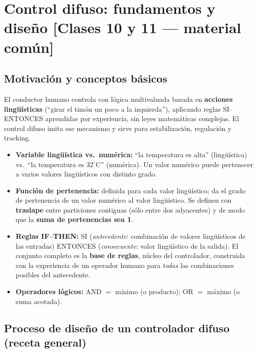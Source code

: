 \documentclass[11pt,a4paper]{article}
\newcommand{\grados}{^{\circ}}
\begin{document}
\section{Control difuso: fundamentos y diseño \hfill {\normalsize [Clases 10 y 11 — material común]}}

\subsection{Motivación y conceptos básicos}

El conductor humano controla con lógica multivaluada basada en \textbf{acciones lingüísticas} (``girar el timón un poco a la izquierda''), aplicando reglas SI--ENTONCES aprendidas por experiencia, sin leyes matemáticas complejas. El control difuso imita ese mecanismo y sirve para estabilización, regulación y tracking.

\begin{itemize}[itemsep=1pt]
\item \textbf{Variable lingüística vs.\ numérica:} ``la temperatura es alta'' (lingüística) vs.\ ``la temperatura es $32\grados$C'' (numérica). Un valor numérico puede pertenecer a varios valores lingüísticos con distinto grado.
\item \textbf{Función de pertenencia:} definida para cada valor lingüístico; da el grado de pertenencia de un valor numérico al valor lingüístico. Se definen con \textbf{traslape} entre particiones contiguas (sólo entre dos adyacentes) y de modo que la \textbf{suma de pertenencias sea 1}.
\item \textbf{Reglas IF--THEN:} SI (\emph{antecedente}: combinación de valores lingüísticos de las entradas) ENTONCES (\emph{consecuente}: valor lingüístico de la salida). El conjunto completo es la \textbf{base de reglas}, núcleo del controlador, construida con la experiencia de un operador humano para \emph{todas} las combinaciones posibles del antecedente.
\item \textbf{Operadores lógicos:} AND $=$ mínimo (o producto); OR $=$ máximo (o suma acotada).
\end{itemize}

\subsection{Proceso de diseño de un controlador difuso (receta general)}
\end{document}
